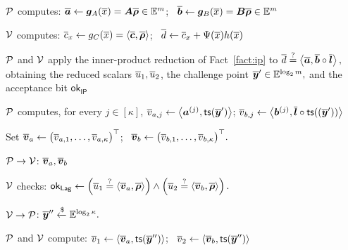 \begin{algorithm}[!t]
\(\mathcal{P}\) computes:
\(
    \overline{\bm a}
    \leftarrow
    \bm g_A(\overline{x})
    =
    \bm A\overline{\bm\rho}
    \in\mathbb{E}^m
\);~
\(
    \overline{\bm b}
    \leftarrow
    \bm g_B(\overline{x})
    =
    \bm B\overline{\bm\rho}
    \in\mathbb{E}^m
\)\;

\(\mathcal{V}\) computes:
\(
    \overline{c}_x
    \leftarrow
    g_C(\overline{x})
    =
    \left\langle
        \overline{\bm c},\overline{\bm\rho}
    \right\rangle
\);~
\(
    \overline{d}
    \leftarrow
    \overline{c}_x
    +
    \Psi(\overline{x})h(\overline{x})
\)\;

\(\mathcal{P}\) and \(\mathcal{V}\) apply the inner-product reduction
of Fact~\ref{fact:ip} to
\(
    \overline{d}
    \mathrel{\overset{\mathrm{?}}{=}}
    \left\langle
        \overline{\bm a},
        \overline{\bm b}\circ\overline{\bm l}
    \right\rangle,
\)
obtaining the reduced scalars
\(\overline{u}_1,\overline{u}_2\), the challenge point
\(
    \overline{\bm y}'
    \in\mathbb{E}^{\log_2m},
\)
and the acceptance bit \(\mathsf{ok}_{\mathsf{IP}}\)\;

\(\mathcal{P}\) computes, for every \(j\in[\kappa]\),
\(
    \overline{v}_{a,j}
    \leftarrow
    \left\langle
        \bm a^{(j)},
        {\sf ts}(\overline{\bm y}')
    \right\rangle
\);
\(
    \overline{v}_{b,j}
    \leftarrow
    \left\langle
        \bm b^{(j)},
        \overline{\bm l}
        \circ
        {\sf ts}((\overline{\bm y}'))
    \right\rangle
\)\;

Set
\(
    \overline{\bm v}_a
    \leftarrow
    \bigl(
        \overline{v}_{a,1},\ldots,\overline{v}_{a,\kappa}
    \bigr)^\top
\);~
\(
    \overline{\bm v}_b
    \leftarrow
    \bigl(
        \overline{v}_{b,1},\ldots,\overline{v}_{b,\kappa}
    \bigr)^\top.
\)

\({\mathcal{P} \rightarrow \mathcal{V}}\):
\(\overline{\bm v}_a,\overline{\bm v}_b\)\;

\(\mathcal{V}\) checks:
\(
    \mathsf{ok}_{\mathsf{Lag}}
    \leftarrow
    \left(
        \overline{u}_1
        \mathrel{\overset{\mathrm{?}}{=}}
        \left\langle
            \overline{\bm v}_a,\overline{\bm\rho}
        \right\rangle
    \right)
    \wedge
    \left(
        \overline{u}_2
        \mathrel{\overset{\mathrm{?}}{=}}
        \left\langle
            \overline{\bm v}_b,\overline{\bm\rho}
        \right\rangle
    \right).
\)

\({\mathcal{V} \rightarrow \mathcal{P}}\):
\(
    \overline{\bm{y}}''
    \mathrel{\xleftarrow{\$}}
    \mathbb{E}^{\log_2 \kappa}.
\)

\(\mathcal{P}\) and \(\mathcal{V}\) compute:
\(
    \overline{v}_1
    \leftarrow
    \left\langle
        \overline{\bm v}_a,
        {\sf ts}(\overline{\bm y}'')
    \right\rangle
\);~
\(
    \overline{v}_2
    \leftarrow
    \left\langle
        \overline{\bm v}_b,
        {\sf ts}(\overline{\bm y}'')
    \right\rangle
\)\;


\end{algorithm}
